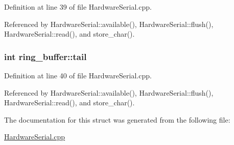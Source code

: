 Definition at line 39 of file HardwareSerial.cpp.



Referenced by HardwareSerial::available(), HardwareSerial::flush(), HardwareSerial::read(), and store\_\-char().

\hypertarget{structring__buffer_a4d06965736f37f64f15bbd0ca9457771}{
\subsubsection[{tail}]{\setlength{\rightskip}{0pt plus 5cm}int {\bf ring\_\-buffer::tail}}}
\label{structring__buffer_a4d06965736f37f64f15bbd0ca9457771}


Definition at line 40 of file HardwareSerial.cpp.



Referenced by HardwareSerial::available(), HardwareSerial::flush(), HardwareSerial::read(), and store\_\-char().



The documentation for this struct was generated from the following file:\begin{DoxyCompactItemize}
\item 
\hyperlink{_hardware_serial_8cpp}{HardwareSerial.cpp}\end{DoxyCompactItemize}

